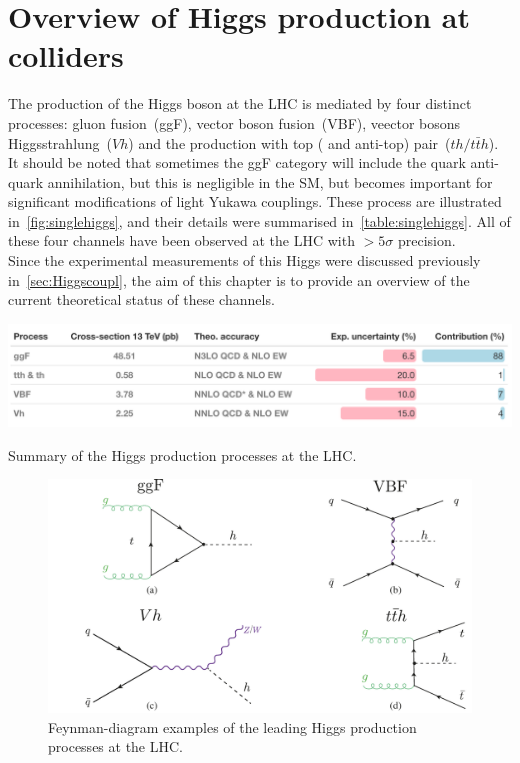  
\chapter{ Overview of Higgs production at colliders }\label{chap:overviewSingleHiggs}
The production of the Higgs boson at the LHC is mediated by four distinct processes: gluon fusion~(ggF), vector boson fusion~(VBF), veector bosons Higgsstrahlung~($Vh$) and the production with top ( and anti-top) pair~($th / t \bar th$). It should be noted that sometimes the ggF category will include the quark anti-quark annihilation, but this is negligible in the SM, but becomes important for significant modifications of light Yukawa couplings. These process are illustrated in~\autoref{fig:singlehiggs}, and their details were summarised in~\autoref{table:singlehiggs}. All of these four channels have been observed at the LHC with $>5 \sigma$ precision. \\ 
Since the experimental measurements of this Higgs were discussed previously in~\autoref{sec:Higgscoupl}, the aim of this chapter is to provide an overview of the current theoretical status of these channels.
\begin{table}[htbp!]
	\includegraphics[width=1\textwidth]{single_higgs_table}
	\caption{ Summary  of the Higgs production processes at the LHC. \label{table:singlehiggs} }
\end{table}
\begin{figure}[htbp!]
	\begin{center}
		\includegraphics[width=.75\textwidth]{figures/single_higgs}
		\caption{Feynman-diagram examples of the leading  Higgs production processes  at the LHC. \label{fig:singlehiggs} }
	\end{center}
\end{figure}
